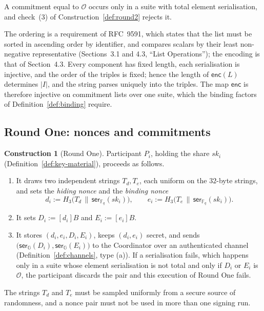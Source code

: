 \documentclass[11pt,a4paper]{article}
\theoremstyle{definition}
\newtheorem{construction}[theorem]{Construction}
\newcommand{\F}{\mathbb{F}}
\newcommand{\G}{\mathbb{G}}
\newcommand{\Fq}{\F_q}
\begin{document}
A commitment equal to \(\mathcal{O}\) occurs only in a suite with total
element serialisation, and check~(3) of Construction~\ref{def:round2}
rejects it.

The ordering is a requirement of RFC~9591, which states that the list must
be sorted in ascending order by identifier, and compares scalars by their
least non-negative representative (Sections~3.1 and 4.3, ``List
Operations''); the encoding is that of Section~4.3. Every component has
fixed length, each serialisation is injective, and the order of the triples
is fixed; hence the length of \(\mathsf{enc}(L)\) determines
\(\lvert I \rvert\), and the string parses uniquely into the triples.
The map \(\mathsf{enc}\) is therefore injective on commitment lists over one
suite, which the binding factors of Definition~\ref{def:binding} require.

\subsection{Round One: nonces and commitments}\label{sec:sign-round1}

\begin{construction}[Round One]\label{def:round1}
Participant \(P_i\), holding the share \(\mathit{sk}_i\)
(Definition~\ref{def:key-material}), proceeds as follows.
\begin{enumerate}
\item It draws two independent strings \(T_d, T_e\), each uniform on the
  \(32\)-byte strings, and sets the \emph{hiding nonce} and the
  \emph{binding nonce}
  \[
    d_i := H_3\bigl(T_d \,\|\, \mathsf{ser}_{\Fq}(\mathit{sk}_i)\bigr) ,
    \qquad
    e_i := H_3\bigl(T_e \,\|\, \mathsf{ser}_{\Fq}(\mathit{sk}_i)\bigr) .
  \]
\item It sets \(D_i := [d_i]B\) and \(E_i := [e_i]B\).
\item It stores \((d_i, e_i, D_i, E_i)\), keeps \((d_i, e_i)\) secret, and
  sends \(\bigl(\mathsf{ser}_{\G}(D_i), \mathsf{ser}_{\G}(E_i)\bigr)\) to
  the Coordinator over an authenticated channel
  (Definition~\ref{def:channels}, type (a)). If a serialisation fails,
  which happens only in a suite whose element serialisation is not total
  and only if \(D_i\) or \(E_i\) is \(\mathcal{O}\), the participant
  discards the pair and this execution of Round One fails.
\end{enumerate}
The strings \(T_d\) and \(T_e\) must be sampled uniformly from a secure
source of randomness, and a nonce pair must not be used in more than one
signing run.
\end{construction}
\end{document}
